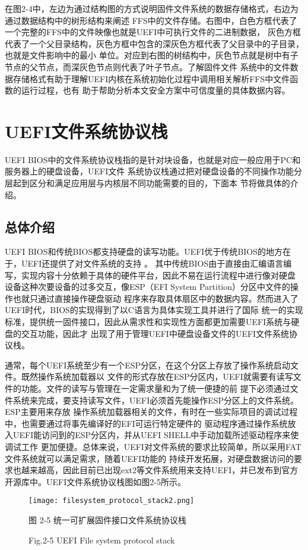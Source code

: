 在图2-4中，左边为通过结构图的方式说明固件文件系统的数据存储格式，右边为通过数据结构中的树形结构来阐述
FFS中的文件存储。右图中，白色方框代表了一个完整的FFS中的文件映像也就是UEFI中可执行文件的二进制数据，
灰色方框代表了一个父目录结构，灰色方框中包含的深灰色方框代表了父目录中的子目录，也就是文件影响中的最小
单位。对应到右图的树结构中，灰色节点就是树中有子节点的父节点，而深灰色节点则代表了叶子节点。了解固件文件
系统中的文件数据存储格式有助于理解UEFI内核在系统初始化过程中调用相关解析FFS中文件函数的运行过程，也有
助于帮助分析本文安全方案中可信度量的具体数据内容。
%
%
\section{UEFI文件系统协议栈}
UEFI BIOS中的文件系统协议栈指的是针对块设备，也就是对应一般应用于PC和服务器上的硬盘设备，UEFI文件
系统协议栈通过把对硬盘设备的不同操作功能分层起到区分和满足应用层与内核层不同功能需要的目的，下面本
节将做具体的介绍。
\subsection{总体介绍}
UEFI BIOS和传统BIOS都支持硬盘的读写功能。UEFI优于传统BIOS的地方在于，UEFI还提供了对文件系统的支持
\cite{english18}。
其中传统BIOS由于直接由汇编语言编写，实现内容十分依赖于具体的硬件平台，因此不易在运行流程中进行像对硬盘
设备这种次要设备的过多交互，像ESP（EFI System Partition）分区中文件的操作也就只通过直接操作硬盘驱动
程序来存取具体扇区中的数据内容。然而进入了UEFI时代，BIOS的实现得到了以C语言为具体实现工具并进行了国际
统一的实现标准，提供统一固件接口，因此从需求性和实现性方面都更加需要UEFI系统与硬盘的交互功能，因此才
出现了用于管理UEFI中硬盘设备文件的UEFI文件系统协议栈。
\par 通常，每个UEFI系统至少有一个ESP分区，在这个分区上存放了操作系统启动文件。既然操作系统加载器以
文件的形式存放在ESP分区内，UEFI就需要有读写文件的功能。文件的读写与管理在一定需求量和为了统一便捷的前
提下必须通过文件系统来完成，要支持读写文件，UEFI必须首先能操作ESP分区上的文件系统。ESP主要用来存放
操作系统加载器相关的文件，有时在一些实际项目的调试过程中，也需要通过将事先编译好的EFI可运行特定硬件的
驱动程序通过操作系统放入UEFI能访问到的ESP分区内，并从UEFI SHELL中手动加载所述驱动程序来使调试工作
更加便捷。总体来说，UEFI对文件系统的要求比较简单，所以采用FAT文件系统就可以满足需求，随着UEFI功能的
持续开发拓展，对硬盘数据访问的要求也越来越高，因此目前已出现ext2等文件系统用来支持UEFI，并已发布到官方
开源库中。UEFI文件系统协议栈图如图2-5所示。

\begin{figure}[htb]
    \vspace{0cm}   
    \setlength{\abovecaptionskip}{0.3cm}  
	\centering
    \texttt{[image: filesystem\_protocol\_stack2.png]}
    \caption*{图 2-5 统一可扩展固件接口文件系统协议栈}
    \setlength{\belowcaptionskip}{-0.7cm}
    \caption*{Fig.2-5 UEFI File system protocol stack}
\end{figure}

